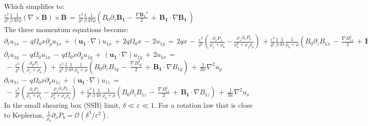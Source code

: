 \documentclass[letterpaper,12pt]{article}
\newcommand\reye{\mathrel{Re}}
\begin{document}
Which simplifies to: \\

$\frac{\varepsilon^2}{\delta^2} \frac{1}{\beta} \frac{1}{4 \pi \rho} \left( \nabla \times \mathbf{B} \right) \times \mathbf{B} \, = \, \frac{\varepsilon^2}{\delta^2} \frac{1}{\beta} \frac{1}{4 \pi \rho} \left(B_0 \partial_z \mathbf{B_1} - \, \frac{\nabla \mathbf{B_1}^2}{2} \, + \, \mathbf{B_1}\cdot \nabla \mathbf{B_1} \, \right)$ \\

The three momentum equations become: \\

$\partial_t u_{1x} \, - \, q \Omega_0 x \partial_y u_{1x} \,+ \, \left(\mathbf{u_1} \cdot \nabla\right)u_{1x} \, + \, 2 q \Omega_0 x \, - \, 2 u_{1y}\,= \, 2 q x \, - \, \frac{\varepsilon^2}{\delta^2} \left( \frac{\partial_x P_1}{\rho_1 + \rho_b} - \frac{\rho_1\partial_x P_b}{\rho_b^2 + \rho_1\rho_b}\right) \, + \frac{\varepsilon^2}{\delta^2} \frac{1}{\beta} \frac{1}{4\pi} \frac{1}{\rho_b + \rho} \left( B_0 \partial_z B_{1x} \,- \, \frac{\nabla B_{1x}^2}{2} \, + \, \mathbf{B_1}\cdot \nabla B_{1x} \right) \, + \, \frac{1}{\reye}\nabla^2 u_x  $ \\

$\partial_t u_{1y} \, - \, q \Omega_0 u_{1x} \, - \, q \Omega_0 x \partial_y u_{1y} \,+ \, \left(\mathbf{u_1} \cdot \nabla\right)u_{1y} \,+ \, 2u_{1x} \, =  $\\
$\, - \, \frac{\varepsilon^2}{\delta^2} \left( \frac{\partial_y P_1}{\rho_1 + \rho_b} \right) \, + \, \frac{\varepsilon^2}{\delta^2} \frac{1}{\beta} \frac{1}{4\pi} \frac{1}{\rho_b + \rho} \left( B_0 \partial_z B_{1y} \,- \, \frac{\nabla B_{1y}^2}{2} \, + \, \mathbf{B_1}\cdot \nabla B_{1y} \right) \, + \, \frac{1}{\reye}\nabla^2 u_y  $ \\

$\partial_t u_{1z} \, - \, q \Omega_0 x \partial_y u_{1z} \,+ \, \left(\mathbf{u_1} \cdot \nabla\right)u_{1z} \, = $\\
$\, - \, \frac{\varepsilon^2}{\delta^2} \left( \frac{\partial_z P_1}{\rho_1 + \rho_b} - \frac{\rho_1\partial_z P_b}{\rho_b^2 + \rho_1\rho_b}\right) \, + \frac{\varepsilon^2}{\delta^2} \frac{1}{\beta} \frac{1}{4\pi} \frac{1}{\rho_b + \rho} \left( B_0 \partial_z B_{1z} \,- \, \frac{\nabla B_{1z}^2}{2} \, + \, \mathbf{B_1}\cdot \nabla B_{1z} \right) \, + \, \frac{1}{\reye}\nabla^2 u_x  $ \\

In the small shearing box (SSB) limit, $\delta \ll \varepsilon \ll 1$. For a rotation law that is close to Keplerian, $\frac{1}{\rho_b}\partial_xP_b = \mathcal{O}\left(\delta^3/\varepsilon^2\right). $
\end{document}
